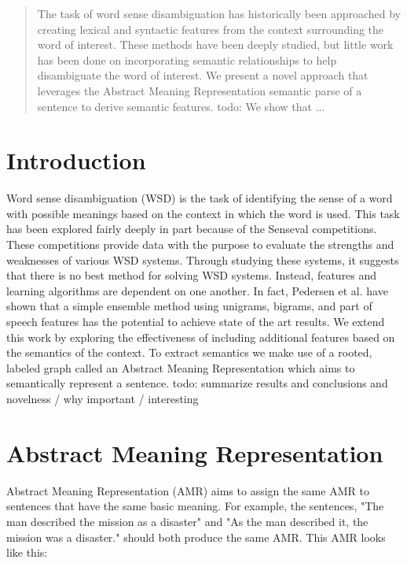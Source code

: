 \documentclass[12pt]{article}
\begin{document}
\maketitle

\begin{abstract}
The task of word sense disambiguation has historically been approached by creating lexical and syntactic features from the context surrounding the word of interest. These methods have been deeply studied, but little work has been done on incorporating semantic relationships to help disambiguate the word of interest. We present a novel approach that leverages the Abstract Meaning Representation semantic parse of a sentence to derive semantic features. todo: We show that ...
\end{abstract}

\section{Introduction}
Word sense disambiguation (WSD) is the task of identifying the sense of a word with possible meanings based on the context in which the word is used. This task has been explored fairly deeply in part because of the Senseval\cite{se} competitions. These competitions provide data with the purpose to evaluate the strengths and weaknesses of various WSD systems. Through studying these systems, it suggests that there is no best method for solving WSD systems. Instead, features and learning algorithms are dependent on one another\cite{kh}. In fact, Pedersen et al. have shown that a simple ensemble method using unigrams, bigrams, and part of speech features has the potential to achieve state of the art results\cite{pend}. We extend this work by exploring the effectiveness of including additional features based on the semantics of the context. To extract semantics we make use of a rooted, labeled graph called an Abstract Meaning Representation which aims to semantically represent a sentence\cite{amr}. todo: summarize results and conclusions and novelness / why important / interesting

\section{Abstract Meaning Representation}

Abstract Meaning Representation (AMR) aims to assign the same AMR to sentences that have the same basic meaning. For example, the sentences, "The man described the mission as a disaster" and "As the man described it, the mission was a disaster." should both produce the same AMR. This AMR looks like this:
\end{document}
